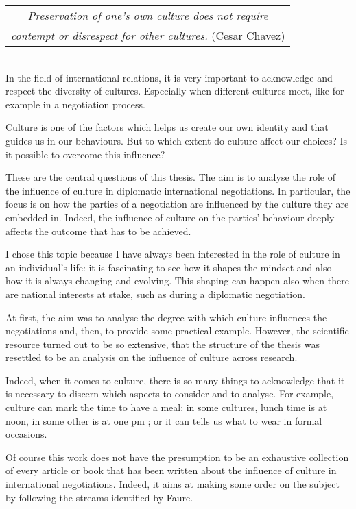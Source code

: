 ﻿\documentclass[../main.tex]{subfiles}
\begin{document}
  \begin{tabular}{c}
 \textit{Preservation of one's own culture does not require}\\
 \textit{contempt or disrespect for other cultures.} (Cesar Chavez)\\
  \end{tabular}\\


In the field of international relations, it is very important to acknowledge and respect the diversity of cultures. Especially when different cultures meet, like for example in a negotiation process.

Culture is one of the factors which helps us create our own identity and that guides us in our behaviours. But to which extent do culture affect our choices? Is it possible to overcome this influence?

These are the central questions of this thesis. The aim is to analyse the role of the influence of culture in diplomatic international negotiations. In particular, the focus is on how the parties of a negotiation are influenced by the culture they are embedded in. Indeed, the influence of culture on the parties' behaviour deeply affects the outcome that has to be achieved.

I chose this topic because I have always been interested in the role of culture in an individual's life: it is fascinating to see how it shapes the mindset and also how it is always changing and evolving. This shaping can happen also when there are national interests at stake, such as during a diplomatic negotiation.

At first, the aim was to analyse the degree with which culture influences the negotiations and, then, to provide some practical example. However, the scientific resource turned out to be so extensive, that the structure of the thesis was resettled to be an analysis on the influence of culture across research.

Indeed, when it comes to culture, there is so many things to acknowledge that it is necessary to discern which aspects to consider and to analyse. For example, culture can mark the time to have a meal: in some cultures, lunch time is at noon, in some other is at one pm \autocite[7]{helen}; or it can tells us what to wear in formal occasions.

Of course this work does not have the presumption to be an exhaustive collection of every article or book that has been written about the influence of culture in international negotiations. Indeed, it aims at making some order on the subject by following the streams identified by Faure.
\end{document}

